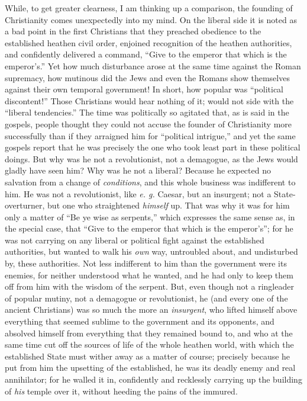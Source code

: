 \documentclass[12pt,a4paper]{book}
\begin{document}
While, to get greater clearness, I am thinking up a comparison, the founding 
of Christianity comes unexpectedly into my mind. On the liberal side it is 
noted as a bad point in the first Christians that they preached obedience to 
the established heathen civil order, enjoined recognition of the heathen 
authorities, and confidently delivered a command, ``Give to the emperor that 
which is the emperor's.'' Yet how much disturbance arose at the same time 
against the Roman supremacy, how mutinous did the Jews and even the Romans 
show themselves against their own temporal government! In short, how popular 
was ``political discontent!'' Those Christians would hear nothing of it; 
would not side with the ``liberal tendencies.'' The time was politically so 
agitated that, as is said in the gospels, people thought they could not accuse 
the founder of Christianity more successfully than if they arraigned him for 
``political intrigue,'' and yet the same gospels report that he was 
precisely the one who took least part in these political doings. But why was 
he not a revolutionist, not a demagogue, as the Jews would gladly have seen 
him? Why was he not a liberal? Because he expected no salvation from a change 
of \textit{conditions}, and this whole business was indifferent to him. He was 
not a revolutionist, like \textit{e. g.} Caesar, but an insurgent; not a 
State-overturner, but one who straightened \textit{himself} up. That was why 
it was for him only a matter of ``Be ye wise as serpents,'' which expresses 
the same sense as, in the special case, that ``Give to the emperor that which 
is the emperor's''; for he was not carrying on any liberal or political fight 
against the established authorities, but wanted to walk his \textit{own} way, 
untroubled about, and undisturbed by, these authorities. Not less indifferent 
to him than the government were its enemies, for neither understood what he 
wanted, and he had only to keep them off from him with the wisdom of the 
serpent. But, even though not a ringleader of popular mutiny, not a demagogue 
or revolutionist, he (and every one of the ancient Christians) was so much the 
more an \textit{insurgent}, who lifted himself above everything that seemed 
sublime to the government and its opponents, and absolved himself from 
everything that they remained bound to, and who at the same time cut off the 
sources of life of the whole heathen world, with which the established State 
must wither away as a matter of course; precisely because he put from him the 
upsetting of the established, he was its deadly enemy and real annihilator; 
for he walled it in, confidently and recklessly carrying up the building of 
\textit{his} temple over it, without heeding the pains of the immured.
\end{document}
